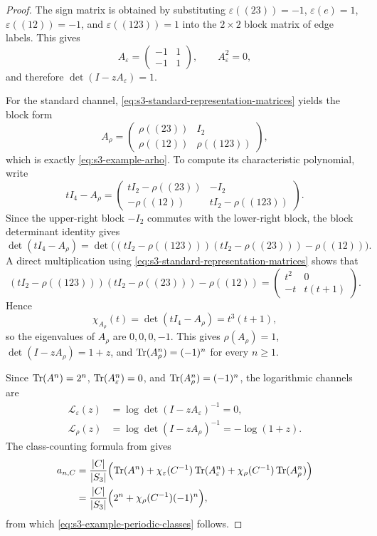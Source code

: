 \begin{proof}
  The sign matrix is obtained by substituting
  \(\varepsilon((23))=-1\), \(\varepsilon(e)=1\),
  \(\varepsilon((12))=-1\), and \(\varepsilon((123))=1\) into the
  \(2\times2\) block matrix of edge labels. This gives
  \[
    A_\varepsilon
    =
    \begin{pmatrix}
      -1 & 1 \\
      -1 & 1
    \end{pmatrix},
    \qquad
    A_\varepsilon^2=0,
  \]
  and therefore \(\det(I-zA_\varepsilon)=1\).

  For the standard channel, \eqref{eq:s3-standard-representation-matrices}
  yields the block form
  \[
    A_\rho
    =
    \begin{pmatrix}
      \rho((23)) & I_2 \\
      \rho((12)) & \rho((123))
    \end{pmatrix},
  \]
  which is exactly \eqref{eq:s3-example-arho}. To compute its
  characteristic polynomial, write
  \[
    tI_4-A_\rho
    =
    \begin{pmatrix}
      tI_2-\rho((23)) & -I_2 \\
      -\rho((12)) & tI_2-\rho((123))
    \end{pmatrix}.
  \]
  Since the upper-right block \(-I_2\) commutes with the lower-right
  block, the block determinant identity gives
  \[
    \det(tI_4-A_\rho)
    =
    \det\!\bigl((tI_2-\rho((123)))(tI_2-\rho((23)))-\rho((12))\bigr).
  \]
  A direct multiplication using
  \eqref{eq:s3-standard-representation-matrices} shows that
  \[
    (tI_2-\rho((123)))(tI_2-\rho((23)))-\rho((12))
    =
    \begin{pmatrix}
      t^2 & 0 \\
      -t & t(t+1)
    \end{pmatrix}.
  \]
  Hence
  \[
    \chi_{A_\rho}(t)=\det(tI_4-A_\rho)=t^3(t+1),
  \]
  so the eigenvalues of \(A_\rho\) are \(0,0,0,-1\). This gives
  \(\rho(A_\rho)=1\), \(\det(I-zA_\rho)=1+z\), and
  \(\operatorname{Tr}(A_\rho^n)=(-1)^n\) for every \(n\ge 1\).

  Since \(\operatorname{Tr}(A^n)=2^n\), \(\operatorname{Tr}(A_\varepsilon^n)=0\), and
  \(\operatorname{Tr}(A_\rho^n)=(-1)^n\), the logarithmic channels are
  \[
    \begin{aligned}
      \mathcal L_\varepsilon(z)
      &=\log\det(I-zA_\varepsilon)^{-1}=0, \\
      \mathcal L_\rho(z)
      &=\log\det(I-zA_\rho)^{-1}=-\log(1+z).
    \end{aligned}
  \]
  The class-counting formula from
   gives
  \[
    \begin{aligned}
      a_{n,C}
      &=
      \frac{|C|}{|S_3|}
        \Bigl(
          \operatorname{Tr}(A^n)
          +\chi_\varepsilon(C^{-1})\operatorname{Tr}(A_\varepsilon^n)
          +\chi_\rho(C^{-1})\operatorname{Tr}(A_\rho^n)
        \Bigr) \\
      &=
      \frac{|C|}{|S_3|}
        \Bigl(2^n+\chi_\rho(C^{-1})(-1)^n\Bigr),
    \end{aligned}
  \]
  from which \eqref{eq:s3-example-periodic-classes} follows.
\end{proof}

